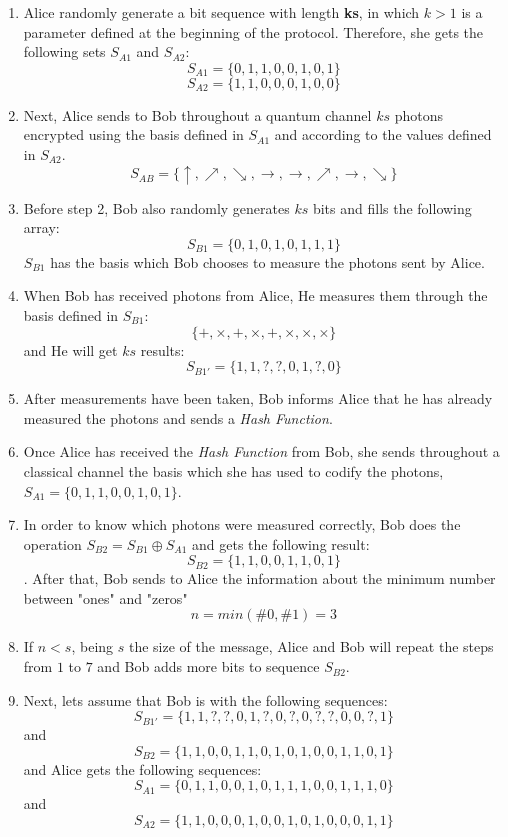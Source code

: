 \begin{enumerate}
  \item Alice randomly generate a bit sequence with length \textbf{ks}, in which $k>1$ is a parameter defined at the beginning of the protocol.
      Therefore, she gets the following sets $S_{A1}$ and $S_{A2}$:
      $$S_{A1} = \{0,1,1,0,0,1,0,1 \}$$
      $$S_{A2} = \{1,1,0,0,0,1,0,0 \}$$

  \item Next, Alice sends to Bob throughout a quantum channel $ks$ photons encrypted using the basis defined in $S_{A1}$ and according to the values defined in $S_{A2}$.
      $$S_{AB} = \{\uparrow, \nearrow, \searrow, \to, \to, \nearrow, \to, \searrow \}$$

  \item Before step 2, Bob also randomly generates $ks$ bits and fills the following array:
  $$S_{B1} = \{0,1,0,1,0,1,1,1 \}$$
  $S_{B1}$ has the basis which Bob chooses to measure the photons sent by Alice.

  \item When Bob has received photons from Alice, He measures them through the basis defined in $S_{B1}$:
  $$\{ +,\times,+,\times,+,\times, \times, \times \}$$ and He will get $ks$ results:
  $$S_{B1\prime} = \{1,1,?,?,0,1,?,0 \}$$

  \item After measurements have been taken, Bob informs Alice that he has already measured the photons and sends a \textit{Hash Function}.

  \item Once Alice has received the \textit{Hash Function} from Bob, she sends throughout a classical channel the basis which she has used to codify the photons, $S_{A1} = \{0,1,1,0,0,1,0,1\}$.

  \item In order to know which photons were measured correctly, Bob does the operation $S_{B2}=S_{B1} \oplus S_{A1}$ and gets the following result: $$S_{B2} = \{1,1,0,0,1,1,0,1 \}$$.
      After that, Bob sends to Alice the information about the minimum number between "ones" and "zeros" $$n=min(\#0,\#1)=3$$

  \item If $n<s$, being $s$ the size of the message, Alice and Bob will repeat the steps from $1$ to $7$ and Bob adds more bits to sequence $S_{B2}$.

  \item Next, lets assume that Bob is with the following sequences: $$S_{B1\prime}= \{1,1,?,?,0,1,?,0,?,0,?,?,0,0,?,1 \}$$ and $$S_{B2}= \{1,1,0,0,1,1,0,1,0,1,0,0,1,1,0,1 \}$$ and Alice gets the following sequences: $$S_{A1}=\{0,1,1,0,0,1,0,1,1,1,0,0,1,1,1,0 \}$$ and $$S_{A2}=\{1,1,0,0,0,1,0,0,1,0,1,0,0,0,1,1 \}$$


\end{enumerate}
